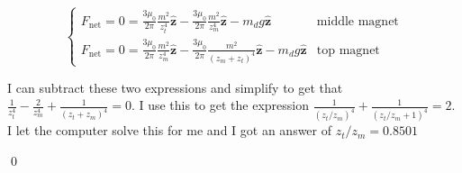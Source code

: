 \documentclass{homework}
\newcommand{\bhat}[1]{\ensuremath{\boldsymbol{\hat{#1}}}}
\begin{document}
\begin{homeworkProblem}[Problem 6.23]
{\begin{enumerate}
      $$
      \begin{cases}
        F_{\text{net}} = 0 = \frac{3 \mu_0}{2 \pi} \frac{m^2}{z_t^4} \bhat{z} - \frac{3 \mu_0}{2 \pi} \frac{m^2}{z_m^4} \bhat{z} - m_d g \bhat{z} &\text{middle magnet} \\
        F_{\text{net}} = 0 = \frac{3 \mu_0}{2 \pi} \frac{m^2}{z_m^4} \bhat{z} - \frac{3 \mu_0}{2 \pi} \frac{m^2}{(z_m + z_t)^4} \bhat{z} - m_d g \bhat{z} &\text{top magnet}
      \end{cases}
      $$

      I can subtract these two expressions and simplify to get that $\frac{1}{z_t^4} - \frac{2}{z_m^4} + \frac{1}{(z_t + z_m)^4} = 0$. I use this to get the expression $\frac{1}{(z_t / z_m)^4} + \frac{1}{(z_t/z_m + 1)^4} = 2$. I let the computer solve this for me and I got an answer of $z_t / z_m = 0.8501$

      \qed
    \end{enumerate}

  }
\end{homeworkProblem}
\end{document}
